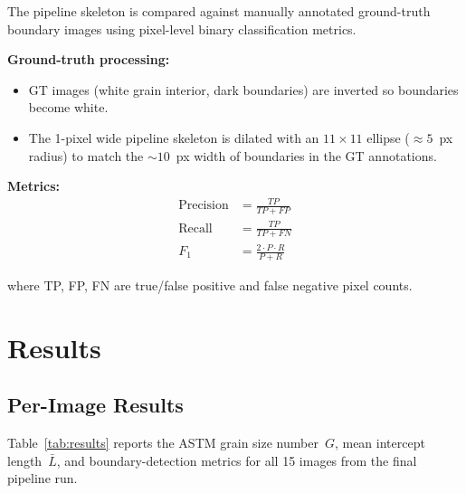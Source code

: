 \documentclass[12pt,a4paper]{article}
\begin{document}
The pipeline skeleton is compared against manually annotated ground-truth
boundary images using pixel-level binary classification metrics.

\textbf{Ground-truth processing:}
\begin{itemize}[leftmargin=*]
    \item GT images (white grain interior, dark boundaries) are inverted so
          boundaries become white.
    \item The 1-pixel wide pipeline skeleton is dilated with an $11\times11$
          ellipse ($\approx5$~px radius) to match the $\sim10$~px width of
          boundaries in the GT annotations.
\end{itemize}

\textbf{Metrics:}
\begin{align}
    \mathrm{Precision} &= \frac{TP}{TP + FP} \\[4pt]
    \mathrm{Recall}    &= \frac{TP}{TP + FN} \\[4pt]
    F_1               &= \frac{2 \cdot P \cdot R}{P + R}
\end{align}

where TP, FP, FN are true/false positive and false negative pixel counts.


\section{Results}

\subsection{Per-Image Results}

Table~\ref{tab:results} reports the ASTM grain size number~$G$, mean
intercept length~$\bar{L}$, and boundary-detection metrics for all 15
images from the final pipeline run.
\end{document}
